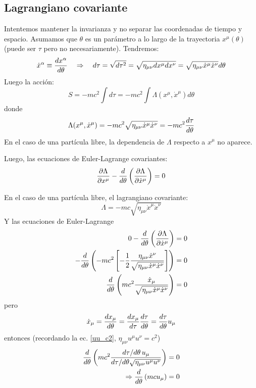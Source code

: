 \documentclass[]{article}
\numberwithin{equation}{section}
\begin{document}
\subsection{Lagrangiano covariante}
Intentemos mantener la invarianza y no separar las coordenadas de tiempo y espacio. Asumamos que \(\theta\) es un parámetro a lo largo de la trayectoria \(x^\mu (\theta)\) (puede ser \(\tau\) pero no necesariamente). Tendremos:
\begin{equation*}
	\dot{x}^{\alpha} \equiv \dfrac{d x^{\alpha}}{d \theta} ~~~ \Rightarrow ~~~ d\tau = \sqrt{d\tau^2} = \sqrt{\eta_{\mu\nu} dx^{\mu} dx^{\nu}} = \sqrt{\eta_{\mu\nu} \dot{x}^{\mu} \dot{x}^{\nu}} d\theta
\end{equation*}
Luego la acción:
\begin{equation}
	S = -m c^2 \int d\tau = -m c^2 \int \Lambda(x^{\mu},\dot{x}^{\mu}) d\theta
\end{equation}
donde
\begin{equation}
	\Lambda(x^{\mu},\dot{x}^{\mu}) = -mc^2 \sqrt{\eta_{\mu\nu} \dot{x}^{\mu} \dot{x}^{\nu}} = -mc^2 \dfrac{d \tau}{d \theta}
\end{equation}
En el caso de una partícula libre, la dependencia de \(\Lambda\) respecto a \(x^{\mu}\) no aparece.

Luego, las ecuaciones de Euler-Lagrange covariantes:
\begin{equation}
	\dfrac{\partial \Lambda}{\partial x^\mu} - \dfrac{d }{d \theta}\left(\dfrac{\partial \Lambda}{\partial \dot{x}^\mu}\right) = 0
\end{equation}

En el caso de una partícula libre, el lagrangiano covariante:
\begin{equation}
	\Lambda = -mc\sqrt{\eta_{\mu\nu} \dot{x}^{\mu} \dot{x}^{\nu}}
\end{equation}
Y las ecuaciones de Euler-Lagrange
\begin{align*}
	0 - \dfrac{d }{d \theta}\left(\dfrac{\partial \Lambda}{\partial \dot{x}^\mu}\right) &= 0 \\
	- \dfrac{d }{d \theta}\left(-mc^2 \left[-\frac{1}{2} \frac{\eta_{\mu\nu} \dot{x}^{\nu}}{\sqrt{\eta_{\mu\nu} \dot{x}^{\mu} \dot{x}^{\nu}}}\right]\right) &= 0  \\
	\dfrac{d }{d \theta}\left(mc^2 \frac{\dot{x}_{\mu}}{\sqrt{\eta_{\mu\nu} \dot{x}^{\mu} \dot{x}^{\nu}}}\right) &= 0
\end{align*}
pero
\begin{equation*}
	\dot{x}_{\mu} = \dfrac{d x_{\mu}}{d \theta} = \dfrac{d x_{\mu}}{d \tau} \dfrac{d \tau}{d \theta} = \dfrac{d \tau}{d \theta} u_{\mu}
\end{equation*}
entonces (recordando la ec. \ref{uu_c2}, \(\eta_{\mu\nu}u^\mu u^\nu = c^2 \))
\begin{align}
	\dfrac{d }{d \theta} \left(mc^2 \frac{d \tau/d \theta \, u_{\mu}}{d \tau/d \theta \sqrt{\eta_{\mu\nu} u^{\mu} u^{\nu}}}\right) &= 0 \nonumber\\
	\Rightarrow \dfrac{d }{d \theta} \left(m c u_{\mu}\right) &= 0
\end{align}
\end{document}
